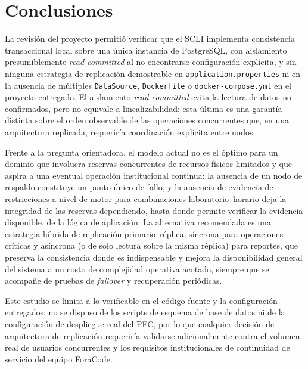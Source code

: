 \documentclass[conference]{IEEEtran}
\begin{document}
\section{Conclusiones}

La revisi\'on del proyecto permiti\'o verificar que el SCLI implementa consistencia transaccional local sobre una \'unica instancia de PostgreSQL, con aislamiento presumiblemente \emph{read committed} al no encontrarse configuraci\'on expl\'icita, y sin ninguna estrategia de replicaci\'on demostrable en \texttt{application.properties} ni en la ausencia de m\'ultiples \texttt{DataSource}, \texttt{Dockerfile} o \texttt{docker-compose.yml} en el proyecto entregado. El aislamiento \emph{read committed} evita la lectura de datos no confirmados, pero no equivale a linealizabilidad: esta \'ultima es una garant\'ia distinta sobre el orden observable de las operaciones concurrentes que, en una arquitectura replicada, requerir\'ia coordinaci\'on expl\'icita entre nodos.

Frente a la pregunta orientadora, el modelo actual no es el \'optimo para un dominio que involucra reservas concurrentes de recursos f\'isicos limitados y que aspira a una eventual operaci\'on institucional continua: la ausencia de un nodo de respaldo constituye un punto \'unico de fallo, y la ausencia de evidencia de restricciones a nivel de motor para combinaciones laboratorio--horario deja la integridad de las reservas dependiendo, hasta donde permite verificar la evidencia disponible, de la l\'ogica de aplicaci\'on. La alternativa recomendada es una estrategia h\'ibrida de replicaci\'on primario--r\'eplica, s\'incrona para operaciones cr\'iticas y as\'incrona (o de solo lectura sobre la misma r\'eplica) para reportes, que preserva la consistencia donde es indispensable y mejora la disponibilidad general del sistema a un costo de complejidad operativa acotado, siempre que se acompa\~ne de pruebas de \emph{failover} y recuperaci\'on peri\'odicas.

Este estudio se limita a lo verificable en el c\'odigo fuente y la configuraci\'on entregados; no se dispuso de los scripts de esquema de base de datos ni de la configuraci\'on de despliegue real del PFC, por lo que cualquier decisi\'on de arquitectura de replicaci\'on requerir\'ia validarse adicionalmente contra el volumen real de usuarios concurrentes y los requisitos institucionales de continuidad de servicio del equipo ForaCode.

\FloatBarrier
\end{document}
